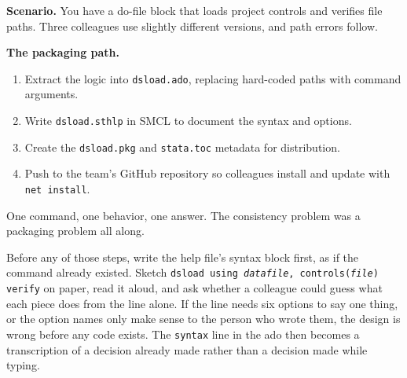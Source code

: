 \documentclass[
    a4paper,
    fontsize=10pt,
    twoside=true,
    numbers=noenddot,
]{kaobook}
\newcounter{appliedexample}
\newenvironment{appliedexample}[1][]{%
    \refstepcounter{appliedexample}%
    \begin{appliedexamplebox}[frametitle={Applied Example~\theappliedexample.~~#1}]%
}{%
    \end{appliedexamplebox}%
}
\begin{document}
\begin{appliedexample}[Turning a one-off script into a shared tool]\label{ae:ch15-sharedtool}
\textbf{Scenario.} You have a do-file block that loads project controls and verifies file paths. Three colleagues use slightly different versions, and path errors follow.

\medskip
\textbf{The packaging path.}
\begin{enumerate}
    \item Extract the logic into \texttt{dsload.ado}, replacing hard-coded paths with command arguments.
    \item Write \texttt{dsload.sthlp} in SMCL to document the syntax and options.
    \item Create the \texttt{dsload.pkg} and \texttt{stata.toc} metadata for distribution.
    \item Push to the team's GitHub repository so colleagues install and update with \texttt{net install}.
\end{enumerate}
One command, one behavior, one answer. The consistency problem was a packaging problem all along.
\end{appliedexample}

Before any of those steps, write the help file's syntax block first, as if the command already existed. Sketch \texttt{dsload using \textit{datafile}, controls(\textit{file}) verify} on paper, read it aloud, and ask whether a colleague could guess what each piece does from the line alone. If the line needs six options to say one thing, or the option names only make sense to the person who wrote them, the design is wrong before any code exists. The \texttt{syntax} line in the ado then becomes a transcription of a decision already made rather than a decision made while typing.
\end{document}
